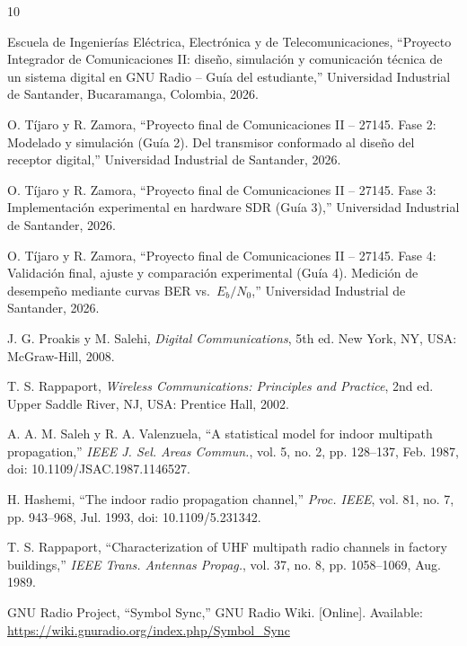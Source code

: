 \begin{thebibliography}{10}

 Escuela de Ingenierías Eléctrica, Electrónica y de Telecomunicaciones, ``Proyecto Integrador de Comunicaciones II: diseño, simulación y comunicación técnica de un sistema digital en GNU Radio -- Guía del estudiante,'' Universidad Industrial de Santander, Bucaramanga, Colombia, 2026.

 O. Tíjaro y R. Zamora, ``Proyecto final de Comunicaciones II -- 27145. Fase 2: Modelado y simulación (Guía 2). Del transmisor conformado al diseño del receptor digital,'' Universidad Industrial de Santander, 2026.

 O. Tíjaro y R. Zamora, ``Proyecto final de Comunicaciones II -- 27145. Fase 3: Implementación experimental en hardware SDR (Guía 3),'' Universidad Industrial de Santander, 2026.

 O. Tíjaro y R. Zamora, ``Proyecto final de Comunicaciones II -- 27145. Fase 4: Validación final, ajuste y comparación experimental (Guía 4). Medición de desempeño mediante curvas BER vs.\ $E_b/N_0$,'' Universidad Industrial de Santander, 2026.

 J. G. Proakis y M. Salehi, \emph{Digital Communications}, 5th ed. New York, NY, USA: McGraw-Hill, 2008.

 T. S. Rappaport, \emph{Wireless Communications: Principles and Practice}, 2nd ed. Upper Saddle River, NJ, USA: Prentice Hall, 2002.

 A. A. M. Saleh y R. A. Valenzuela, ``A statistical model for indoor multipath propagation,'' \emph{IEEE J. Sel. Areas Commun.}, vol. 5, no. 2, pp. 128--137, Feb. 1987, doi: 10.1109/JSAC.1987.1146527.

 H. Hashemi, ``The indoor radio propagation channel,'' \emph{Proc. IEEE}, vol. 81, no. 7, pp. 943--968, Jul. 1993, doi: 10.1109/5.231342.

 T. S. Rappaport, ``Characterization of UHF multipath radio channels in factory buildings,'' \emph{IEEE Trans. Antennas Propag.}, vol. 37, no. 8, pp. 1058--1069, Aug. 1989.

 GNU Radio Project, ``Symbol Sync,'' GNU Radio Wiki. [Online]. Available: \url{https://wiki.gnuradio.org/index.php/Symbol_Sync}

\end{thebibliography}
